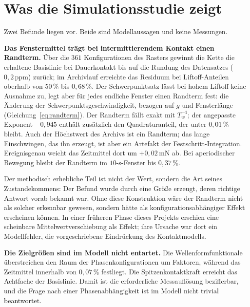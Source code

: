 \documentclass[12pt,a4paper]{report}
\begin{document}
\section{Was die Simulationsstudie zeigt}
\label{sec:sim-zeigt}

Zwei Befunde liegen vor. Beide sind Modellaussagen und keine Messungen.

\vspace{0.5em}

\textbf{Das Fenstermittel trägt bei intermittierendem Kontakt einen
Randterm.} Über die $361$ Konfigurationen des Rasters gewinnt die Kette
die erhaltene Basislinie bei Dauerkontakt bis auf die Rundung des
Datensatzes ($0{,}2\,\mathrm{ppm}$) zurück; im Archivlauf erreichte das Residuum bei Liftoff-Anteilen
oberhalb von $50\,\%$ bis $0{,}68\,\%$. Der Schwerpunktsatz lässt bei
hohem Liftoff keine Ausnahme zu, legt aber für jedes endliche Fenster
einen Randterm fest: die Änderung der Schwerpunktsgeschwindigkeit,
bezogen auf $g$ und Fensterlänge (Gleichung~\eqref{eq:randterm}). Der
Randterm fällt exakt mit $T_w^{-1}$; der angepasste Exponent $-0{,}945$
enthält zusätzlich den Quadraturanteil, der unter $0{,}01\,\%$ bleibt.
Auch der Höchstwert des Archivs ist ein Randterm; das lange Einschwingen,
das ihn erzeugt, ist aber ein Artefakt der Festschritt-Integration.
Ereignisgenau weicht das Zeitmittel dort um $+0{,}02\,\mathrm{mN}$ ab. Bei
aperiodischer Bewegung bleibt der Randterm im $10$-s-Fenster bis
$0{,}37\,\%$.

Der methodisch erhebliche Teil ist nicht der Wert, sondern die Art seines
Zustandekommens: Der Befund wurde durch eine Größe erzeugt, deren
richtige Antwort vorab bekannt war. Ohne diese Konstruktion wäre der
Randterm nicht als solcher erkennbar gewesen, sondern hätte
als konfigurationsabhängiger Effekt erscheinen können. In einer früheren
Phase dieses Projekts erschien eine scheinbare Mittelwertverschiebung als
Effekt; ihre Ursache war dort ein Modellfehler, die vorgeschriebene
Eindrückung des Kontaktmodells.

\vspace{0.5em}

\textbf{Die Zielgrößen sind im Modell nicht entartet.} Die
Wellenformfunktionale überstreichen den Raum der Phasenkonfigurationen um
Faktoren, während das Zeitmittel innerhalb von $0{,}07\,\%$ festliegt.
Die Spitzenkontaktkraft erreicht das Achtfache der Basislinie. Damit ist
die erforderliche Messauflösung bezifferbar, und die Frage nach einer
Phasenabhängigkeit ist im Modell nicht trivial beantwortet.
\end{document}

